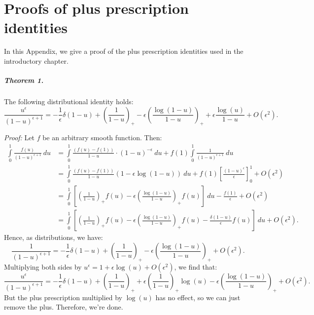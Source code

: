 \documentclass[withindex,glossary]{cam-thesis}
\begin{document}
\chapter{Proofs of plus prescription identities}
\label{app:plus_prescription}
In this Appendix, we give a proof of the plus prescription identities used in the introductory chapter.

\paragraph{Theorem 1.} The following distributional identity holds:
\begin{equation}
\label{eq:plus_identity_2}
\frac{u^{\epsilon}}{(1-u)^{\epsilon+1}} = -\frac{1}{\epsilon} \delta(1-u) + \left( \frac{1}{1-u} \right)_+ - \epsilon \left( \frac{\log(1-u)}{1-u} \right)_+ + \epsilon \frac{\log(u)}{1-u} + O(\epsilon^2).
\end{equation}

\noindent \textit{Proof:} Let $f$ be an arbitrary smooth function. Then:
\begin{align}
\int\limits_{0}^{1} \frac{f(u)}{(1-u)^{\epsilon + 1}}\ du &= \int\limits_{0}^{1} \frac{(f(u) - f(1))}{1-u} \cdot (1-u)^{-\epsilon}\ du + f(1) \int\limits_{0}^{1} \frac{1}{(1-u)^{\epsilon + 1}}\ du\\[1.5ex]
&= \int\limits_{0}^{1} \frac{(f(u) - f(1))}{1-u} (1 - \epsilon \log(1-u))\ du + f(1) \left[ \frac{(1-u)^{\epsilon}}{\epsilon} \right]^{1}_{0} + O(\epsilon^2)\\[1.5ex]
&= \int\limits_{0}^{1} \left[ \left( \frac{1}{1-u} \right)_+ f(u) - \epsilon \left( \frac{\log(1-u)}{1-u} \right)_+ f(u) \right]\ du - \frac{f(1)}{\epsilon} + O(\epsilon^2)\\[1.5ex]
&= \int\limits_{0}^{1} \left[ \left( \frac{1}{1-u} \right)_+ f(u) - \epsilon \left( \frac{\log(1-u)}{1-u} \right)_+ f(u) - \frac{\delta(1-u)}{\epsilon} f(u) \right]\ du + O(\epsilon^2).
\end{align}
Hence, as distributions, we have:
\begin{equation}
\frac{1}{(1-u)^{\epsilon+1}} = -\frac{1}{\epsilon} \delta(1-u) + \left( \frac{1}{1-u} \right)_+ - \epsilon \left( \frac{\log(1-u)}{1-u} \right)_+ + O(\epsilon^2).
\end{equation}
Multiplying both sides by $u^{\epsilon} = 1 + \epsilon \log(u) + O(\epsilon^2)$, we find that:
\begin{equation}
\frac{u^{\epsilon}}{(1-u)^{\epsilon+1}} = -\frac{1}{\epsilon} \delta(1-u) + \left( \frac{1}{1-u} \right)_+ + \epsilon \left( \frac{1}{1-u} \right)_+ \log(u) - \epsilon \left( \frac{\log(1-u)}{1-u} \right)_+ + O(\epsilon^2).
\end{equation}
But the plus prescription multiplied by $\log(u)$ has no effect, so we can just remove the plus. Therefore, we're done. \qedsymbol\\
\end{document}
